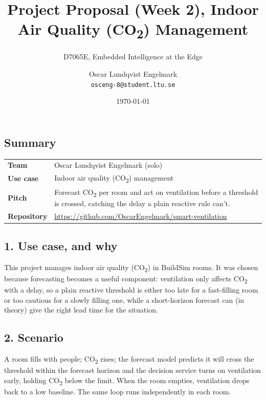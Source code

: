 \documentclass[
  11pt,
]{article}
\title{Project Proposal (Week 2), Indoor Air Quality (CO\textsubscript{2}) Management}
\subtitle{D7065E, Embedded Intelligence at the Edge}
\author{Oscar Lundqvist Engelmark\\ \texttt{osceng-8@student.ltu.se}}
\date{\today}
\begin{document}
\maketitle


\subsection{Summary}\label{summary}

\begin{longtable}[]{@{}
  >{\raggedright\arraybackslash}p{}
  >{\raggedright\arraybackslash}p{}@{}}
\toprule
\endhead
\textbf{Team} & Oscar Lundqvist Engelmark (solo) \\
\textbf{Use case} & Indoor air quality (CO\textsubscript{2}) management \\
\textbf{Pitch} & Forecast CO\textsubscript{2} per room and act on
ventilation before a threshold is crossed, catching the delay a plain
reactive rule can't. \\
\textbf{Repository} & \url{https://github.com/OscarEngelmark/smart-ventilation} \\
\bottomrule
\end{longtable}

\subsection{1. Use case, and why}\label{use-case-and-why}

This project manages indoor air quality (CO\textsubscript{2}) in BuildSim rooms. It was
chosen because forecasting becomes a useful component: ventilation
only affects CO\textsubscript{2} with a delay, so a plain reactive threshold is either
too late for a fast-filling room or too cautious for a slowly filling one,
while a short-horizon forecast can (in theory) give the right lead time for the
situation.

\subsection{2. Scenario}\label{scenario}

A room fills with people; CO\textsubscript{2} rises; the forecast model predicts it will
cross the threshold within the forecast horizon and the decision service
turns on ventilation early, holding CO\textsubscript{2} below the limit. When the room
empties, ventilation drops back to a low baseline. The same loop runs
independently in each room.
\end{document}
